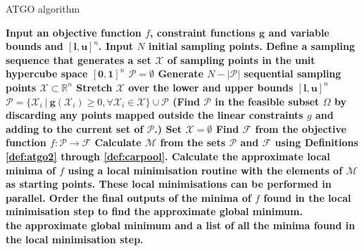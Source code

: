\begin{algorithm}
\caption{ATGO algorithm}
\label{alg:atgo}
\begin{algorithmic}[1]
\State \bf{Input} \normalfont an objective function $f$, constraint functions $\mathbf{g}$ and variable bounds and $[\mathbf{l}, \mathbf{u}]^n$.
\State \bf{Input} \normalfont $N$ initial sampling points.
\State Define a sampling sequence that generates a set $\mathcal{X}$ of sampling points in the unit hypercube space $[\mathbf{0}, \mathbf{1}]^n$
\EndProcedure
{}
\State $\mathcal{P} = \emptyset$
\State Generate $N - |\mathcal{P}|$ sequential sampling points $\mathcal{X} \subset \mathbb{R}^n$
\State Stretch $\mathcal{X}$ over the lower and upper bounds $[\mathbf{l}, \mathbf{u}]^n$
\State  $\mathcal{P} = \{\mathcal{X}_i ~|~ \mathbf{g}(\mathcal{X}_i) \geq 0, \forall \mathcal{X}_i \in \mathcal{X}\} \cup\mathcal{P}$ 
\Comment (Find $\mathcal{P}$ in the feasible subset $\Omega$ by discarding any points mapped outside the linear constraints $g$ and adding to the current set of $\mathcal{P}$.)
\State Set $\mathcal{X} = \emptyset$
\EndWhile
\State Find $\mathcal{F}$ from the objective function $f: \mathcal{P} \rightarrow \mathcal{F}$
\EndProcedure
{}
\State Calculate $\mathcal{M}$ from the sets $\mathcal{P}$ and $\mathcal{F}$ using Definitions \ref{def:atgo2} through \ref{def:carpool}.
\EndProcedure
{}
\State Calculate the approximate local minima of $f$ using a local minimisation routine with the elements of $\mathcal{M}$ as starting points.
\Comment These local minimisations can be performed in parallel.
\EndProcedure
{}
\State Order the final outputs of the minima of $f$ found in the local minimisation step to find the approximate global minimum.
\EndProcedure \\
\Return the approximate global minimum and a list of all the minima found in the local minimisation step.
\end{algorithmic}
\end{algorithm} 



